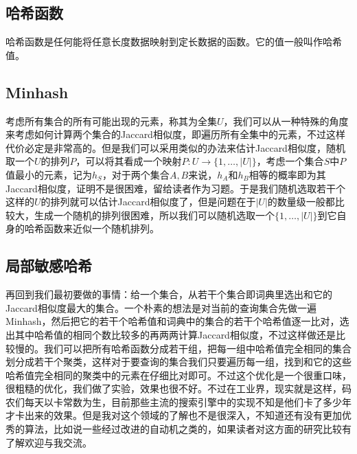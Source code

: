 \documentclass{article}
\begin{document}
	\subsection{哈希函数}
	哈希函数是任何能将任意长度数据映射到定长数据的函数。它的值一般叫作哈希值。
	\subsection{Minhash}
	考虑所有集合的所有可能出现的元素，称其为全集$U$，我们可以从一种特殊的角度来考虑如何计算两个集合的Jaccard相似度，即遍历所有全集中的元素，不过这样代价必定是非常高的。但是我们可以采用类似的办法来估计Jaccard相似度，随机取一个$U$的排列$P$，可以将其看成一个映射$P:U\to \{1,\ldots,|U|\}$，考虑一个集合$S$中$P$值最小的元素，记为$h_S$，对于两个集合$A,B$来说，$h_A$和$h_B$相等的概率即为其Jaccard相似度，证明不是很困难，留给读者作为习题。于是我们随机选取若干个这样的$U$的排列就可以估计Jaccard相似度了，但是问题在于$|U|$的数量级一般都比较大，生成一个随机的排列很困难，所以我们可以随机选取一个$\{1,\ldots,|U|\}$到它自身的哈希函数来近似一个随机排列。
	\subsection{局部敏感哈希}
	再回到我们最初要做的事情：给一个集合，从若干个集合即词典里选出和它的Jaccard相似度最大的集合。一个朴素的想法是对当前的查询集合先做一遍Minhash，然后把它的若干个哈希值和词典中的集合的若干个哈希值逐一比对，选出其中哈希值的相同个数比较多的再两两计算Jaccard相似度，不过这样做还是比较慢的。我们可以把所有哈希函数分成若干组，把每一组中哈希值完全相同的集合划分成若干个聚类，这样对于要查询的集合我们只要遍历每一组，找到和它的这些哈希值完全相同的聚类中的元素在仔细比对即可。不过这个优化是一个很重口味，很粗糙的优化，我们做了实验，效果也很不好。不过在工业界，现实就是这样，码农们每天以卡常数为生，目前那些主流的搜索引擎中的实现不知是他们卡了多少年才卡出来的效果。但是我对这个领域的了解也不是很深入，不知道还有没有更加优秀的算法，比如说一些经过改进的自动机之类的，如果读者对这方面的研究比较有了解欢迎与我交流。
\end{document}
